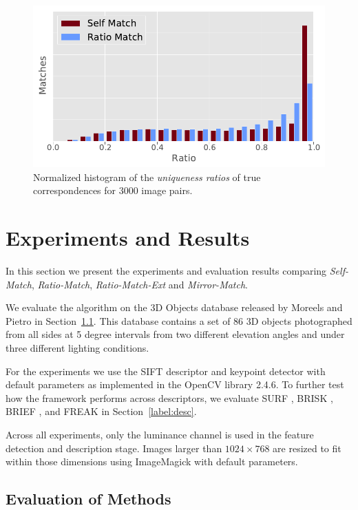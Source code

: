 \documentclass[review]{elsarticle}
\begin{document}
\begin{figure}[htb]
\centering
\includegraphics[width=0.7\columnwidth]{images/results_ratio_hist}
\caption{Normalized histogram of the \emph{uniqueness ratios} of true 
correspondences for 3000 image pairs.}
\label{fig:ratio_hist}
\end{figure}


\section{Experiments and Results}
\label{S:Experiments}
%
In this section we present the experiments and evaluation results comparing \emph{Self-Match}, \emph{Ratio-Match}, \emph{Ratio-Match-Ext} and \emph{Mirror-Match}. 

We evaluate the algorithm on the 3D Objects database released by Moreels and Pietro \cite{moreels2007evaluation} in Section~\ref{S:3dobjects}. This database contains a set of 86 3D objects photographed from all sides at 5 degree intervals from two different elevation angles and under three different lighting conditions. 

For the experiments we use the SIFT descriptor and keypoint detector with default parameters as implemented in the OpenCV library 2.4.6.  To further test how the framework performs across descriptors, we evaluate SURF \cite{bay2006surf}, BRISK \cite{leutenegger2011brisk}, BRIEF \cite{calonder2010brief}, and FREAK \cite{alahi2012freak} in Section~\ref{label:desc}. 

Across all experiments, only the luminance channel is used in the feature detection and description stage.  Images larger than $1024\!\times\!768$ are resized to fit within those dimensions using ImageMagick with default parameters.  

\subsection{Evaluation of Methods}
\label{S:3dobjects}
\end{document}
